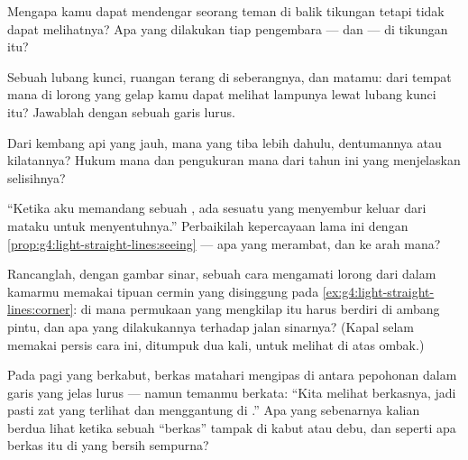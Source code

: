 \begin{exercise}[$\star$]\label{exo:g4:light-straight-lines:6}
Mengapa kamu dapat mendengar seorang teman di balik tikungan tetapi
tidak dapat melihatnya? Apa yang dilakukan tiap pengembara --- 
dan  --- di tikungan itu?
\end{exercise}

\begin{exercise}[$\star$]\label{exo:g4:light-straight-lines:7}
Sebuah lubang kunci, ruangan terang di seberangnya, dan matamu: dari
tempat mana di lorong yang gelap kamu dapat melihat lampunya lewat
lubang kunci itu? Jawablah dengan sebuah garis lurus.
\end{exercise}

\begin{exercise}[$\star$]\label{exo:g4:light-straight-lines:8}
Dari kembang api yang jauh, mana yang tiba lebih dahulu, dentumannya
atau kilatannya? Hukum mana dan pengukuran mana dari tahun ini yang
menjelaskan selisihnya?
\end{exercise}

\begin{exercise}[$\star$]\label{exo:g4:light-straight-lines:9}
``Ketika aku memandang sebuah , ada sesuatu yang menyembur
keluar dari mataku untuk menyentuhnya.'' Perbaikilah kepercayaan lama
ini dengan \cref{prop:g4:light-straight-lines:seeing} --- apa yang
merambat, dan ke arah mana?
\end{exercise}

\begin{exercise}[$\star\star$]\label{exo:g4:light-straight-lines:10}
Rancanglah, dengan gambar sinar, sebuah cara mengamati lorong dari
dalam kamarmu memakai tipuan cermin yang disinggung pada
\cref{ex:g4:light-straight-lines:corner}: di mana permukaan yang
mengkilap itu harus berdiri di ambang pintu, dan apa yang dilakukannya
terhadap jalan sinarnya? (Kapal selam memakai persis cara ini,
ditumpuk dua kali, untuk melihat di atas ombak.)
\end{exercise}

\begin{exercise}[$\star\star$]\label{exo:g4:light-straight-lines:11}
Pada pagi yang berkabut, berkas matahari mengipas di antara pepohonan
dalam garis yang jelas lurus --- namun temanmu berkata: ``Kita melihat
berkasnya, jadi  pasti zat yang terlihat dan menggantung di
.'' Apa yang sebenarnya kalian berdua lihat ketika sebuah
``berkas'' tampak di kabut atau debu, dan seperti apa berkas itu di
 yang bersih sempurna?
\end{exercise}
